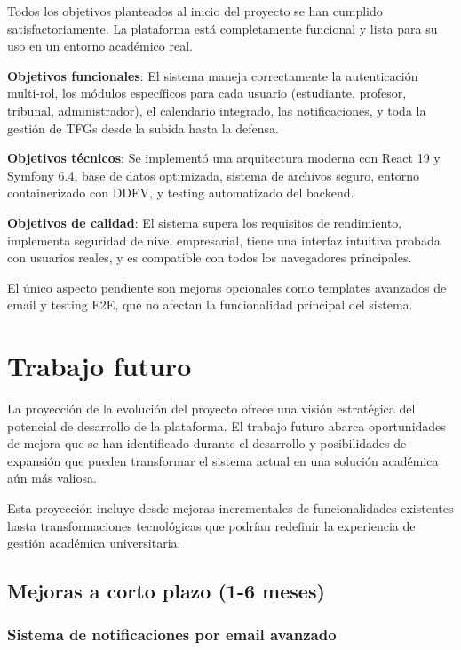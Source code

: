 \documentclass[12pt,a4paper,oneside]{report}
\begin{document}
Todos los objetivos planteados al inicio del proyecto se han cumplido satisfactoriamente. La plataforma está completamente funcional y lista para su uso en un entorno académico real.

\textbf{Objetivos funcionales}: El sistema maneja correctamente la autenticación multi-rol, los módulos específicos para cada usuario (estudiante, profesor, tribunal, administrador), el calendario integrado, las notificaciones, y toda la gestión de TFGs desde la subida hasta la defensa.

\textbf{Objetivos técnicos}: Se implementó una arquitectura moderna con React 19 y Symfony 6.4, base de datos optimizada, sistema de archivos seguro, entorno containerizado con DDEV, y testing automatizado del backend.

\textbf{Objetivos de calidad}: El sistema supera los requisitos de rendimiento, implementa seguridad de nivel empresarial, tiene una interfaz intuitiva probada con usuarios reales, y es compatible con todos los navegadores principales.

El único aspecto pendiente son mejoras opcionales como templates avanzados de email y testing E2E, que no afectan la funcionalidad principal del sistema.

\section{Trabajo futuro}\label{trabajo-futuro}

La proyección de la evolución del proyecto ofrece una visión estratégica del potencial de desarrollo de la plataforma. El trabajo futuro abarca oportunidades de mejora que se han identificado durante el desarrollo y posibilidades de expansión que pueden transformar el sistema actual en una solución académica aún más valiosa.

Esta proyección incluye desde mejoras incrementales de funcionalidades existentes hasta transformaciones tecnológicas que podrían redefinir la experiencia de gestión académica universitaria.

\subsection{Mejoras a corto plazo (1-6
meses)}\label{mejoras-a-corto-plazo-1-6-meses}

\subsubsection{Sistema de notificaciones por email
avanzado}\label{sistema-de-notificaciones-por-email-avanzado}
\end{document}
